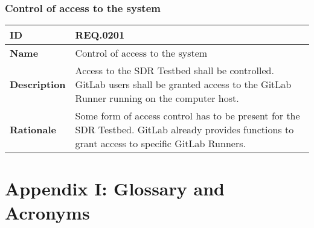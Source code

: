 \documentclass[english,titlepage,a4paper]{report}
\newcommand{\requirement}[5]{
  \subsection{#2}
  #5

  \noindent
  \begin{tabular}{|l|p{9cm}|}
    \hline
    \textbf{ID} & #1 \\
    \hline
    \textbf{Name} & #2 \\
    \hline
    \textbf{Description} & #3 \\
    \hline
    \textbf{Rationale} & #4 \\
    \hline
  \end{tabular}
}
\begin{document}
\requirement{REQ.0201}{Control of access to the system}{
  Access to the \gls{SDR Testbed} shall be controlled.
  \gls{GitLab} users shall be granted access to the \gls{GitLab} Runner running on the computer host.
}{
  Some form of access control has to be present for the \gls{SDR Testbed}.
  \gls{GitLab} already provides functions to grant access to specific \gls{GitLab} Runners.
}{}


\chapter*{Appendix I: Glossary and Acronyms}

\printglossary
\printglossary[type=\acronymtype]
\end{document}
